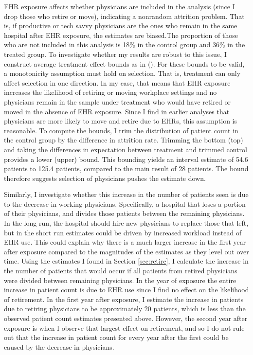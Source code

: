 \documentclass[12pt]{article}
\begin{document}
EHR exposure affects whether physicians are included in the analysis (since I drop those who retire or move), indicating a nonrandom attrition problem. That is, if productive or tech savvy physicians are the ones who remain in the same hospital after EHR exposure, the estimates are biased.The proportion of those who are not included in this analysis is 18\% in the control group and 36\% in the treated group. To investigate whether my results are robust to this issue, I construct average treatment effect bounds as in  \citeauthor{lee2009training} (\citeyear{lee2009training}). For these bounds to be valid, a monotonicity assumption must hold on selection. That is, treatment can only affect selection in one direction. In my case, that means that EHR exposure increases the likelihood of retiring or moving workplace settings and no physicians remain in the sample under treatment who would have retired or moved in the absence of EHR exposure. Since I find in earlier analyses that physicians are more likely to move and retire due to EHRs, this assumption is reasonable. To compute the bounds, I trim the distribution of patient count in the control group by the difference in attrition rate. Trimming the bottom (top) and taking the differences in expectation between treatment and trimmed control provides a lower (upper) bound. This bounding yields an interval estimate of 54.6 patients to 125.4 patients, compared to the main result of 28 patients. The bound therefore suggests selection of physicians pushes the estimate down.

Similarly, I investigate whether this increase in the number of patients seen is due to the decrease in working physicians. Specifically, a hospital that loses a portion of their physicians, and divides those patients between the remaining physicians. In the long run, the hospital should hire new physicians to replace those that left, but in the short run estimates could be driven by increased workload instead of EHR use. This could explain why there is a much larger increase in the first year after exposure compared to the magnitudes of the estimates as they level out over time. Using the estimates I found in Section \ref{sec:retire}, I calculate the increase in the number of patients that would occur if all patients from retired physicians were divided between remaining physicians. In the year of exposure the entire increase in patient count is due to EHR use since I find no effect on the likelihood of retirement. In the first year after exposure, I estimate the increase in patients due to retiring physicians to be approximately 20 patients, which is less than the observed patient count estimates presented above. However, the second year after exposure is when I observe that largest effect on retirement, and so I do not rule out that the increase in patient count for every year after the first could be caused by the decrease in physicians. 
\end{document}
